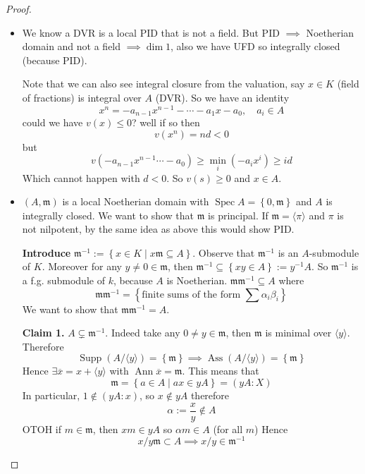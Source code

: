 \documentclass[11pt,a4paper]{article}
\theoremstyle{definition}
\theoremstyle{plain}
\theoremstyle{remark}
\renewcommand{\set}[1]{\left\{ #1 \right\}}
\newcommand{\angles}[1]{\langle #1 \rangle}
\newcommand{\Ann}{\operatorname{Ann}}
\newcommand{\Spec}{\operatorname{Spec}}
\newcommand{\Supp}{\operatorname{Supp}}
\newcommand{\Ass}{\operatorname{Ass}}
\begin{document}
\begin{proof}
    \begin{itemize}
        \item We know a DVR is a local PID that is not a field. But PID $\implies$ Noetherian domain and not a field $\implies \dim 1$, also we have UFD 
        so integrally closed (because PID). 
        
        Note that we can also see integral closure from the valuation, say $x \in K$ (field of fractions) is integral over $A$ (DVR). 
        So we have an identity 
        $$x^n = -a_{n-1} x^{n-1} - \cdots - a_1 x - a_0, \quad a_i \in A$$
        could we have $v(x) \le 0$? well if so then 
        $$v(x^n) = nd < 0$$
        but 
        $$v(-a_{n-1} x^{n-1} \cdots - a_0) \ge \min_i \left(-a_ix^i\right) \ge id$$ 
        Which cannot happen with $d < 0$. So $v(s) \ge 0$ and $x \in A$. 

        \item $(A, \mathfrak{m})$ is a local Noetherian domain with $\Spec A = \set{0 , \mathfrak{m}}$ and $A$ is integrally closed. We want to show that $\mathfrak{m}$ is principal. If 
        $\mathfrak{m} = \angles{\pi}$ and $\pi$ is not nilpotent, by the same idea as above this would show PID. 

        \textbf{Introduce} $\mathfrak{m}^{-1} := \set{x \in K \mid x \mathfrak{m} \subseteq A}$. Observe that $\mathfrak{m}^{-1}$ is an $A$-submodule of 
        $K$. Moreover for any $y \ne 0 \in \mathfrak{m}$, then $\mathfrak{m}^{-1} \subseteq \set{xy \in A} := y^{-1}A$. So $\mathfrak{m}^{-1}$ is a f.g. submodule 
        of $k$, because $A$ is Noetherian. $\mathfrak{m} \mathfrak{m}^{-1} \subseteq A$ where 
        $$\mathfrak{m} \mathfrak{m}^{-1} = \set{\text{finite sums of the form } \sum \alpha_i \beta_i}$$
        We want to show that $\mathfrak{m} \mathfrak{m}^{-1} = A$.  

        \textbf{Claim 1.} $A \subsetneq \mathfrak{m}^{-1}$. Indeed take any $0 \ne y \in \mathfrak{m}$, then $\mathfrak{m}$ is minimal over $\angles{y}$. 
        Therefore 
        $$\Supp (A/ \angles{y}) = \set{\mathfrak{m}} \implies \Ass (A / \angles{y}) = \set{\mathfrak{m}}$$
        Hence $\exists \overline{x} = x + \angles{y}$ with $\Ann \overline{x} = \mathfrak{m}$. This means that 
        $$\mathfrak{m} = \set{a \in A \mid ax \in yA} = (yA \colon X)$$
        In particular, $1 \not\in (yA \colon x)$, so $x \not\in yA$ therefore 
        $$\alpha := \frac{x}{y} \not\in A$$
        OTOH if $m \in \mathfrak{m}$, then $xm \in yA$ so $\alpha m \in A$ (for all $m$) Hence 
        $$x/y \mathfrak{m} \subset A \implies x/y \in \mathfrak{m}^{-1}$$
        

\end{itemize}
\end{proof}
\end{document}
